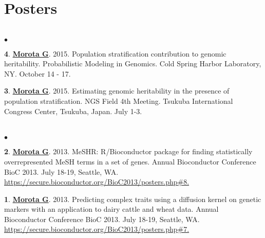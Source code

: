 \documentclass[margin,line,10pt]{res}
\newenvironment{list2}{
  \begin{list}{$\bullet$}{%
      \setlength{\itemsep}{0in}
      \setlength{\parsep}{0in} \setlength{\parskip}{0in}
      \setlength{\topsep}{0in} \setlength{\partopsep}{0in} 
      \setlength{\leftmargin}{0.2in}}}{\end{list}}
\begin{document}
\begin{resume}
\vspace{0.5cm}
\section{ \sc Posters }
\vspace{0.5cm}
\section{}
\begin{list2}

\item  [{\bf 4}.] \textbf{\underline{Morota G}}. 2015. Population stratification contribution to genomic heritability. Probabilistic Modeling in Genomics. Cold Spring Harbor Laboratory, NY. October 14 - 17. 

  \vspace{0.5cm}
  
\item  [{\bf 3}.] \textbf{\underline{Morota G}}. 2015. Estimating genomic heritability in the presence of population stratification. NGS Field 4th Meeting. Tsukuba International Congress Center, Tsukuba, Japan. July 1-3. 
\end{list2}

\section{}
\begin{list2}
\item   [{\bf 2}.]  \textbf{\underline{Morota G}}. 2013. MeSHR: R/Bioconductor package for finding statistically overrepresented  MeSH terms in a set of genes. Annual Bioconductor Conference BioC 2013. July 18-19, Seattle, WA. \\ \textcolor{blue}{\href{https://secure.bioconductor.org/BioC2013/posters.php\#7}{https://secure.bioconductor.org/BioC2013/posters.php\#8. } }  

\vspace{0.5cm}

\item  [{\bf 1}.] \textbf{\underline{Morota G}}. 2013. Predicting complex traits using a diffusion kernel on genetic markers with an application to dairy cattle and wheat data. Annual Bioconductor Conference BioC 2013. July 18-19, Seattle, WA. \textcolor{blue}{\href{https://secure.bioconductor.org/BioC2013/posters.php\#7}{https://secure.bioconductor.org/BioC2013/posters.php\#7. } }  
\end{list2}









\end{resume}
\end{document}
